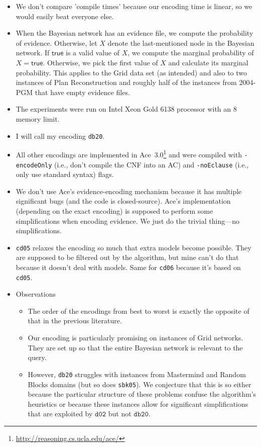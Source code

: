 \documentclass{article}
\theoremstyle{definition}
\theoremstyle{remark}
\begin{document}
\begin{itemize}
\item We don't compare 'compile times' because our encoding time is linear, so
  we would easily beat everyone else.
\item When the Bayesian network has an evidence file, we compute the probability
  of evidence. Otherwise, let $X$ denote the last-mentioned node in the Bayesian
  network. If $\mathsf{true}$ is a valid value of $X$, we compute the marginal
  probability of $X = \mathsf{true}$. Otherwise, we pick the first value of $X$
  and calculate its marginal probability. This applies to the Grid data set (as
  intended) and also to two instances of Plan Reconstruction and roughly half of
  the instances from 2004-PGM that have empty evidence files.
\item The experiments were run on Intel Xeon Gold 6138 processor with an
  \SI{8}{\giga\byte} memory limit.
\item I will call my encoding \texttt{db20}.
\item All other encodings are implemented in
  Ace~3.0\footnote{\url{http://reasoning.cs.ucla.edu/ace/}} and were compiled
  with \texttt{-encodeOnly} (i.e., don't compile the CNF into an AC) and
  \texttt{-noEclause} (i.e., only use standard syntax) flags.
\item We don't use Ace's evidence-encoding mechanism because it has multiple
  significant bugs (and the code is closed-source). Ace's implementation
  (depending on the exact encoding) is supposed to perform some simplifications
  when encoding evidence. We just do the trivial thing---no simplifications.
\item \texttt{cd05} relaxes the encoding so much that extra models become
  possible. They are supposed to be filtered out by the algorithm, but mine
  can't do that because it doesn't deal with models. Same for \texttt{cd06}
  because it's based on \texttt{cd05}.
\item Observations
  \begin{itemize}
  \item The order of the encodings from best to worst is exactly the opposite of
    that in the previous literature.
  \item Our encoding is particularly promising on instances of Grid networks.
    They are set up so that the entire Bayesian network is relevant to the
    query.
  \item However, \texttt{db20} struggles with instances from Mastermind and
    Random Blocks domains (but so does \texttt{sbk05}). We conjecture that this
    is so either because the particular structure of these problems confuse the
    algorithm's heuristics or because these instances allow for significant
    simplifications that are exploited by $\mathtt{d02}$ but not
    $\mathtt{db20}$.
  \end{itemize}
\end{itemize}
\end{document}
